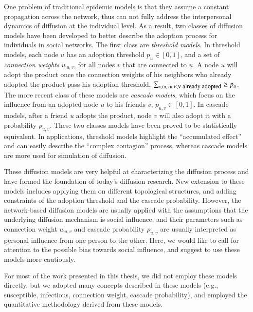 \documentclass[phd,tocprelim]{cornell}
\begin{document}
One problem of traditional epidemic models is that they assume a constant propagation across the network, thus can not fully address the interpersonal dynamics of diffusion at the individual level. As a result, two classes of diffusion models have been developed to better describe the adoption process for individuals in social networks. The first class are \emph{threshold models}\cite{Granovetter:1978}. In threshold models, each node $u$ has an adoption threshold $p_u \in [0,1]$, and a set of \emph{connection weights} $w_{u,v}$, for all nodes $v$ that are connected to $u$. A node $u$ will adopt the product once the connection weights of his neighbors who already adopted the product pass his adoption threshold, $\sum_{v, (u,v)\in E,  \textnormal{\small v already adopted}} \ge p_u$. The more recent class of these models are \emph{cascade models}, which focus on the influence from an adopted node $u$ to his friends $v$, $p_{u,v} \in [0,1]$. In cascade models, after a friend $u$ adopts the product, node $v$ will also adopt it with a probability $p_{u,v}$. These two classes models have been proved to be statistically equivalent\cite{Goldenberg:2001,Kempe-2003}. In applications, threshold models highlight the ``accumulated effect'' and can easily describe the ``complex contagion'' process\cite{Centola:2007}, whereas cascade models are more used for simulation of diffusion\cite{Goldenberg:2001}.

These diffusion models are very helpful at characterizing the diffusion process and have formed the foundation of today's diffusion research. New extension to these models includes applying them on different topological structures\cite{pastor-satorras01,Eguiluz-2002,Dodds:2005}, and adding constraints of the adoption threshold and the cascade probability\cite{wu-2004}. However, the network-based diffusion models are usually applied with the assumptions that the underlying diffusion mechanism is social influence, and their parameters such as connection weight $w_{u,v}$ and cascade probability $p_{u,v}$ are usually interpreted as personal influence from one person to the other. Here, we would like to call for attention to the possible bias towards social influence, and suggest to use these models more cautiously.

For most of the work presented in this thesis, we did not employ these models directly, but we adopted many concepts described in these models (e.g., susceptible, infectious, connection weight, cascade probability), and employed the quantitative methodology derived from these models.
\end{document}
